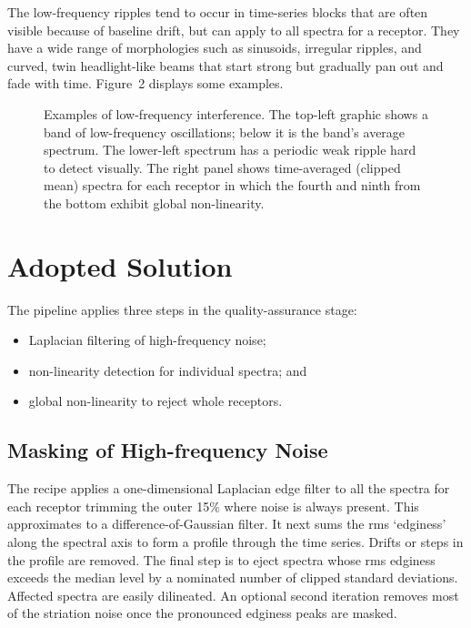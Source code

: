 The low-frequency ripples tend to occur in time-series blocks that are
often visible because of baseline drift, but can apply to all spectra
for a receptor. They have a wide range of morphologies such as
sinusoids, irregular ripples, and curved, twin headlight-like beams
that start strong but gradually pan out and fade with time.  Figure~2
displays some examples.


\begin{figure}[!ht]
\caption{Examples of low-frequency interference.  The top-left 
graphic shows a band of low-frequency oscillations; below it is the 
band's average spectrum.  The lower-left spectrum has a periodic weak
ripple hard to detect visually.  The right panel shows time-averaged
(clipped mean) spectra for each receptor in which the fourth and ninth
from the bottom exhibit global non-linearity.}
\end{figure}

\section{Adopted Solution}

The pipeline applies three steps in the quality-assurance stage: 
\begin{itemize}
\item Laplacian filtering of high-frequency noise;
\item non-linearity detection for individual spectra; and
\item global non-linearity to reject whole receptors.
\end{itemize}

\subsection{Masking of High-frequency Noise}
 
The recipe applies a one-dimensional Laplacian edge filter to all the
spectra for each receptor trimming the outer 15\% where noise is
always present.  This approximates to a difference-of-Gaussian filter.
It next sums the rms `edginess' along the spectral axis to form a
profile through the time series.  Drifts or steps in the profile are
removed.  The final step is to eject spectra whose rms edginess
exceeds the median level by a nominated number of clipped standard
deviations.  Affected spectra are easily dilineated.  An optional
second iteration removes most of the striation noise once the
pronounced edginess peaks are masked.

